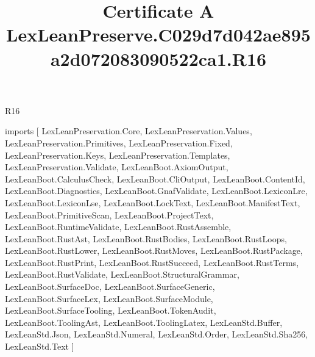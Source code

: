 \begin{lexlean}{R16}
\title{Certificate A LexLeanPreserve.C029d7d042ae895a2d072083090522ca1.R16}
\begin{coremodule}
imports [
  LexLeanPreservation.Core,
  LexLeanPreservation.Values,
  LexLeanPreservation.Primitives,
  LexLeanPreservation.Fixed,
  LexLeanPreservation.Keys,
  LexLeanPreservation.Templates,
  LexLeanPreservation.Validate,
  LexLeanBoot.AxiomOutput,
  LexLeanBoot.CalculusCheck,
  LexLeanBoot.CliOutput,
  LexLeanBoot.ContentId,
  LexLeanBoot.Diagnostics,
  LexLeanBoot.GnafValidate,
  LexLeanBoot.LexiconLre,
  LexLeanBoot.LexiconLse,
  LexLeanBoot.LockText,
  LexLeanBoot.ManifestText,
  LexLeanBoot.PrimitiveScan,
  LexLeanBoot.ProjectText,
  LexLeanBoot.RuntimeValidate,
  LexLeanBoot.RustAssemble,
  LexLeanBoot.RustAst,
  LexLeanBoot.RustBodies,
  LexLeanBoot.RustLoops,
  LexLeanBoot.RustLower,
  LexLeanBoot.RustMoves,
  LexLeanBoot.RustPackage,
  LexLeanBoot.RustPrint,
  LexLeanBoot.RustSucceed,
  LexLeanBoot.RustTerms,
  LexLeanBoot.RustValidate,
  LexLeanBoot.StructuralGrammar,
  LexLeanBoot.SurfaceDoc,
  LexLeanBoot.SurfaceGeneric,
  LexLeanBoot.SurfaceLex,
  LexLeanBoot.SurfaceModule,
  LexLeanBoot.SurfaceTooling,
  LexLeanBoot.TokenAudit,
  LexLeanBoot.ToolingAst,
  LexLeanBoot.ToolingLatex,
  LexLeanStd.Buffer,
  LexLeanStd.Json,
  LexLeanStd.Numeral,
  LexLeanStd.Order,
  LexLeanStd.Sha256,
  LexLeanStd.Text
]


\end{coremodule}
\end{lexlean}
